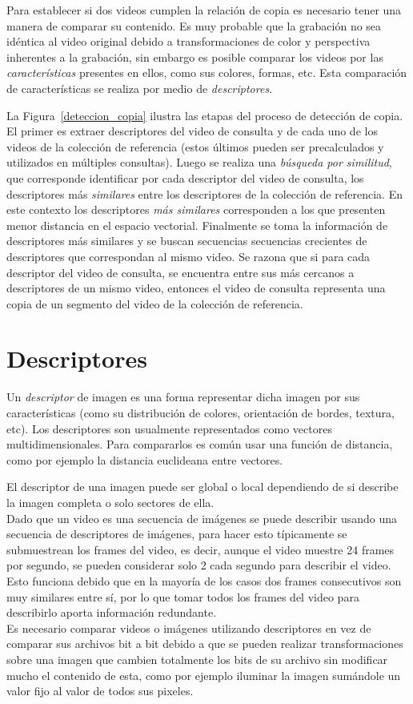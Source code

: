 Para establecer si dos videos cumplen la relación de copia es necesario tener una manera de comparar su contenido. Es muy probable que la grabación no sea idéntica al video original debido a transformaciones de color y perspectiva inherentes a la grabación, sin embargo es posible comparar los videos por las \textit{características} presentes en ellos, como sus colores, formas, etc. Esta comparación de características se realiza por medio de \emph{descriptores}.

La Figura~\ref{deteccion_copia} ilustra las etapas del proceso de detección de copia. El primer es extraer descriptores del video de consulta y de cada uno de los videos de la colección de referencia (estos últimos pueden ser precalculados y utilizados en múltiples consultas). Luego se realiza una \emph{búsqueda por similitud}, que corresponde identificar por cada descriptor del video de consulta, los descriptores más \emph{similares} entre los descriptores de la colección de referencia. En este contexto los descriptores \emph{más similares} corresponden a los que presenten menor distancia en el espacio vectorial. Finalmente se toma la información de descriptores más similares y se buscan secuencias secuencias crecientes de descriptores que correspondan al mismo video. Se razona que si para cada descriptor del video de consulta, se encuentra entre sus más cercanos a descriptores de un mismo video, entonces el video de consulta representa una copia de un segmento del video de la colección de referencia.
\section{Descriptores}\label{descriptores}
Un \emph{descriptor} de imagen es una forma representar dicha imagen por sus características (como su distribución de colores, orientación de bordes, textura, etc). Los descriptores son usualmente representados como vectores multidimensionales. Para compararlos es común usar una función de distancia, como por ejemplo la distancia euclideana entre vectores.

El descriptor de una imagen puede ser global o local dependiendo de si describe la imagen completa o solo sectores de ella. \\
Dado que un video es una secuencia de imágenes se puede describir usando una secuencia de descriptores de imágenes, para hacer esto típicamente se submuestrean los frames del video, es decir, aunque el video muestre 24 frames por segundo, se pueden considerar solo 2 cada segundo para describir el video. Esto funciona debido que en la mayoría de los casos dos frames consecutivos son muy similares entre sí, por lo que tomar todos los frames del video para describirlo aporta información redundante.\\
Es necesario comparar videos o imágenes utilizando descriptores en vez de comparar sus archivos bit a bit debido a que se pueden realizar transformaciones sobre una imagen que cambien totalmente los bits de su archivo sin modificar mucho el contenido de esta, como por ejemplo iluminar la imagen sumándole un valor fijo al valor de todos sus pixeles.

